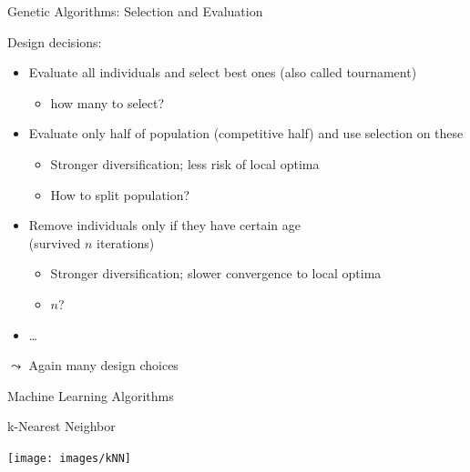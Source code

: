 \begin{frame}[c]{Genetic Algorithms: Selection and Evaluation}

\begin{block}{Design decisions:}
\begin{itemize}
  \item Evaluate all individuals and select best ones (also called tournament)
  \begin{itemize}
    \item how many to select?
  \end{itemize}
  \pause
  \item Evaluate only half of population (competitive half) and use selection on these
  \begin{itemize}
    \item Stronger diversification; less risk of local optima
    \item How to split population?
  \end{itemize}
  \pause
  \item Remove individuals only if they have certain age\\ (survived $n$ iterations)
  \begin{itemize}
    \item Stronger diversification; slower convergence to local optima
    \item $n$?
  \end{itemize}
  \pause
  \item \ldots
\end{itemize}
\end{block}

$\leadsto$ Again many design choices

\end{frame}
\begin{frame}[c]{}

\centering
\huge
Machine Learning Algorithms

\end{frame}
\begin{frame}[c]{k-Nearest Neighbor}

\texttt{[image: images/kNN]}

\end{frame}
